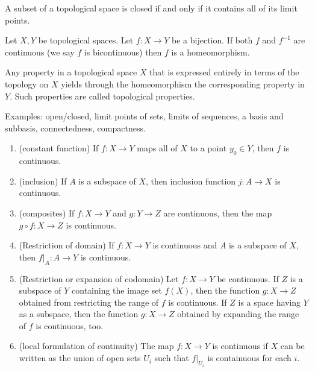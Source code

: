 \documentclass{article}
\newcommand{\inv}{^{-1}}
\begin{document}
\medskip{}

    A subset of a topological space is closed if and only if it contains all of its limit points.

\medskip{}

    Let $X,Y$ be topological spaces. Let $f: X \to Y$ be a bijection. If both $f$ and $f\inv$ are continuous (we say $f$ is bicontinuous) then $f$ is a homeomorphism.

\medskip{}

    Any property in a topological space $X$ that is expressed entirely in terms of the topology on $X$ yields through the homeomorphism the corresponding property in $Y$. Such properties are called topological properties.

    Examples: open/closed, limit points of sets, limits of sequences, a basis and subbasis, connectedness, compactness.

\medskip{}

    \begin{enumerate}
        \item (constant function) If $f: X \to Y$ maps all of $X$ to a point $y_0 \in Y$, then $f$ is continuous.
        \item (inclusion) If $A$ is a subspace of $X$, then inclusion function $j: A \to X$ is continuous.
        \item (composites) If $f: X \to Y$ and $g: Y \to Z$ are continuous, then the map $g \circ f: X \to Z$ is continuous.
        \item (Restriction of domain) If $f: X \to Y$ is continuous and $A$ is a subspace of $X$, then $f|_A: A \to Y$ is continuous.
        \item (Restriction or expansion of codomain) Let $f: X \to Y$ be continuous. If $Z$ is a subspace of $Y$ containing the image set $f(X)$, then the function $g: X \to Z$ obtained from restricting the range of $f$ is continuous.
        If $Z$ is a space having $Y$ as a subspace, then the function $g: X \to Z$ obtained by expanding the range of $f$ is continuous, too.
        \item (local formulation of continuity) The map $f: X \to Y$ is continuous if $X$ can be written as the union of open sets $U_i$ such that $f|_{U_i}$ is containuous for each $i$.
    \end{enumerate}

\medskip{}
\end{document}
